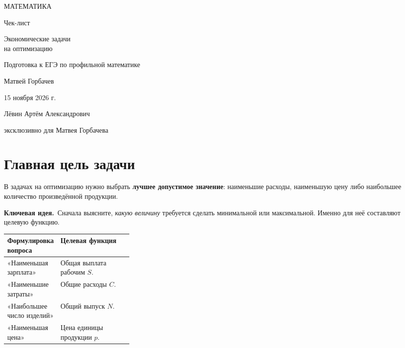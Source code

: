 \documentclass[a4paper,12pt]{article}
\newcommand{\keyidea}[1]{\par\noindent\textcolor{darkaccent}{\textbf{Ключевая идея.}}~#1\par}
\begin{document}
\thispagestyle{empty}
\begin{center}
\vspace*{24mm}
{\large\color{darkaccent} МАТЕМАТИКА\par}
\vspace{13mm}
{\LARGE Чек-лист\par}
\vspace{9mm}
{\huge\color{accent} Экономические задачи\\[2mm] на оптимизацию\par}
\vspace{15mm}
{\large Подготовка к ЕГЭ по профильной математике\par}
\vfill
{\Large Матвей Горбачев\par}
\vspace{10mm}
{\large 15 ноября 2026 г.\par}
\vspace{15mm}
{\normalsize Лёвин Артём Александрович\par}
{\normalsize эксклюзивно для Матвея Горбачева\par}
\vspace{20mm}
\end{center}
\clearpage

\begingroup{}
\section{Главная цель задачи}
В задачах на оптимизацию нужно выбрать \textbf{лучшее допустимое значение}: наименьшие расходы, наименьшую цену либо наибольшее количество произведённой продукции.

\keyidea{Сначала выясните, \emph{какую величину} требуется сделать минимальной или максимальной. Именно для неё составляют целевую функцию.}

\begin{tabularx}{\linewidth}{@{}p{0.30\linewidth}X@{}}
\toprule
\textbf{Формулировка вопроса} & \textbf{Целевая функция}\\
\midrule
«Наименьшая зарплата» & Общая выплата рабочим $S$.\\
«Наименьшие затраты» & Общие расходы $C$.\\
«Наибольшее число изделий» & Общий выпуск $N$.\\
«Наименьшая цена» & Цена единицы продукции $p$.\\
\bottomrule
\end{tabularx}
\end{document}
